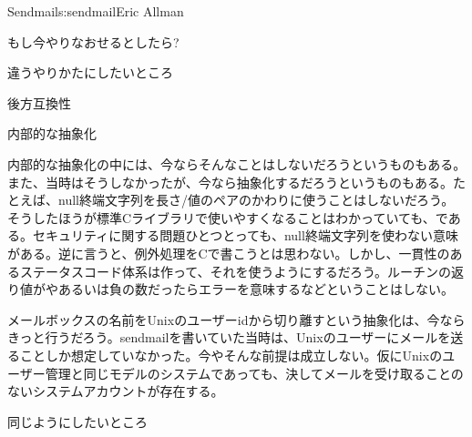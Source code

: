 \begin{aosachapter}{Sendmail}{s:sendmail}{Eric Allman}
\begin{aosasect1}{もし今やりなおせるとしたら?}
\begin{aosasect2}{違うやりかたにしたいところ}
\begin{aosasect3}{後方互換性}
\end{aosasect3}

\begin{aosasect3}{内部的な抽象化}

内部的な抽象化の中には、今ならそんなことはしないだろうというものもある。また、当時はそうしなかったが、今なら抽象化するだろうというものもある。たとえば、null終端文字列を長さ/値のペアのかわりに使うことはしないだろう。そうしたほうが標準Cライブラリで使いやすくなることはわかっていても、である。セキュリティに関する問題ひとつとっても、null終端文字列を使わない意味がある。逆に言うと、例外処理をCで書こうとは思わない。しかし、一貫性のあるステータスコード体系は作って、それを使うようにするだろう。ルーチンの返り値がやあるいは負の数だったらエラーを意味するなどということはしない。

メールボックスの名前をUnixのユーザーidから切り離すという抽象化は、今ならきっと行うだろう。sendmailを書いていた当時は、Unixのユーザーにメールを送ることしか想定していなかった。今やそんな前提は成立しない。仮にUnixのユーザー管理と同じモデルのシステムであっても、決してメールを受け取ることのないシステムアカウントが存在する。

\end{aosasect3}

\end{aosasect2}

\begin{aosasect2}{同じようにしたいところ}


\end{aosasect2}
\end{aosasect1}
\end{aosachapter}
